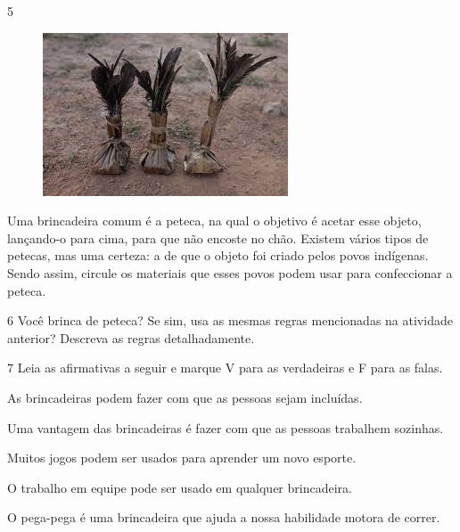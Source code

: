 \num{5}
\begin{figure}
\includegraphics[width=.2\textwidth]{./imgs/img9.jpg}
\end{figure}
Uma brincadeira comum é a peteca, na qual o objetivo é acetar esse objeto, lançando-o para cima,
  para que não encoste no chão. Existem vários tipos de petecas, mas uma certeza: a de que o objeto foi
  criado pelos povos indígenas. Sendo assim, circule os materiais que
  esses povos podem usar para confeccionar a peteca.

\begin{multicols}{2}





\end{multicols}



\num{6} Você brinca de peteca? Se sim, usa as mesmas regras mencionadas na atividade anterior? Descreva as regras detalhadamente.


\num{7} Leia as afirmativas a seguir e marque V para as verdadeiras e F para
  as falas.

\begin{boxlist}
 As brincadeiras podem fazer com que as pessoas sejam incluídas.

 Uma vantagem das brincadeiras é fazer com que as pessoas trabalhem sozinhas.

 Muitos jogos podem ser usados para aprender um novo esporte.

 O trabalho em equipe pode ser usado em qualquer brincadeira.

 O pega-pega é uma brincadeira que ajuda a nossa habilidade motora de correr.
\end{boxlist}

